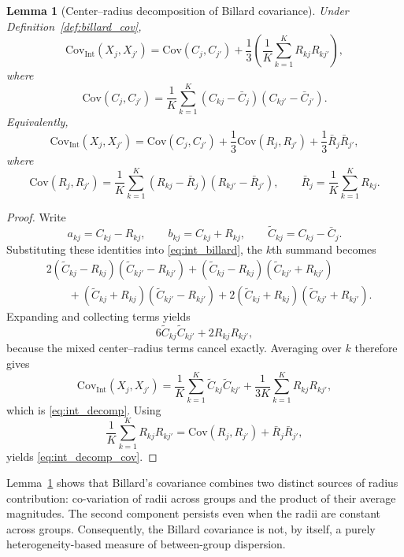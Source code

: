 \documentclass[preprint, times, 12pt, authoryear]{elsarticle}
\newtheorem{lemma}[theorem]{Lemma}
\begin{document}
\begin{lemma}[Center--radius decomposition of Billard covariance]\label{lem:decomp}
	Under Definition~\ref{def:billard_cov},
	\begin{equation}\label{eq:int_decomp}
		\mathrm{Cov}_{\mathrm{Int}}(X_j,X_{j'})
		=
		\mathrm{Cov}(C_j,C_{j'})
		+
		\frac{1}{3}\left(\frac{1}{K}\sum_{k=1}^K R_{kj}R_{kj'}\right),
	\end{equation}
	where
	\begin{equation}\label{eq:center_cov}
		\mathrm{Cov}(C_j,C_{j'})
		=
		\frac{1}{K}\sum_{k=1}^K (C_{kj}-\bar C_j)(C_{kj'}-\bar C_{j'}).
	\end{equation}
	Equivalently,
	\begin{equation}\label{eq:int_decomp_cov}
		\mathrm{Cov}_{\mathrm{Int}}(X_j,X_{j'})
		=
		\mathrm{Cov}(C_j,C_{j'})
		+
		\frac{1}{3}\mathrm{Cov}(R_j,R_{j'})
		+
		\frac{1}{3}\bar R_j \bar R_{j'},
	\end{equation}
	where
	\begin{equation}\label{eq:radius_cov}
		\mathrm{Cov}(R_j,R_{j'})
		=
		\frac{1}{K}\sum_{k=1}^K (R_{kj}-\bar R_j)(R_{kj'}-\bar R_{j'}),
		\qquad
		\bar R_j=\frac{1}{K}\sum_{k=1}^K R_{kj}.
	\end{equation}
\end{lemma}

\begin{proof}
	Write
	\[
	a_{kj}=C_{kj}-R_{kj},
	\qquad
	b_{kj}=C_{kj}+R_{kj},
	\qquad
	\tilde C_{kj}=C_{kj}-\bar C_j.
	\]
	Substituting these identities into \eqref{eq:int_billard}, the $k$th summand becomes
	\begin{align*}
		&2(\tilde C_{kj}-R_{kj})(\tilde C_{kj'}-R_{kj'})
		+(\tilde C_{kj}-R_{kj})(\tilde C_{kj'}+R_{kj'}) \\
		&\qquad
		+(\tilde C_{kj}+R_{kj})(\tilde C_{kj'}-R_{kj'})
		+2(\tilde C_{kj}+R_{kj})(\tilde C_{kj'}+R_{kj'}).
	\end{align*}
	Expanding and collecting terms yields
	\[
	6\tilde C_{kj}\tilde C_{kj'}+2R_{kj}R_{kj'},
	\]
	because the mixed center--radius terms cancel exactly. Averaging over $k$ therefore gives
	\[
	\mathrm{Cov}_{\mathrm{Int}}(X_j,X_{j'})
	=
	\frac{1}{K}\sum_{k=1}^K \tilde C_{kj}\tilde C_{kj'}
	+
	\frac{1}{3K}\sum_{k=1}^K R_{kj}R_{kj'},
	\]
	which is \eqref{eq:int_decomp}. Using
	\[
	\frac{1}{K}\sum_{k=1}^K R_{kj}R_{kj'}
	=
	\mathrm{Cov}(R_j,R_{j'})+\bar R_j\bar R_{j'},
	\]
	yields \eqref{eq:int_decomp_cov}.
\end{proof}

Lemma~\ref{lem:decomp} shows that Billard's covariance combines two distinct sources of radius contribution: co-variation of radii across groups and the product of their average magnitudes. The second component persists even when the radii are constant across groups. Consequently, the Billard covariance is not, by itself, a purely heterogeneity-based measure of between-group dispersion.
\end{document}
